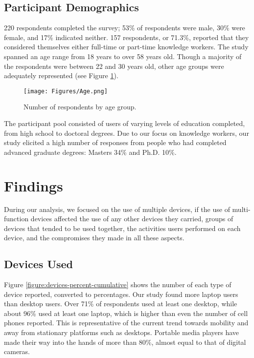 \documentclass[twocolumn,final,10pt]{article}
\begin{document}
\subsection{Participant Demographics}

220 respondents completed the survey; 53\% of respondents were male, 30\% were female, and 17\% indicated neither.
157 respondents, or 71.3\%, reported that they considered themselves either full-time or part-time knowledge workers.
The study spanned an age range from 18 years to over 58 years old. Though a majority of the respondents were between 22 and 30 years old, other age groups were adequately represented (see Figure \ref{figure:age}). 

\begin{figure}[htb] 
   \centering
   \texttt{[image: Figures/Age.png]} 
   \caption{Number of respondents by age group.}
   \label{figure:age}
\end{figure}

The participant pool consisted of users of varying levels of education completed, from high school to doctoral degrees. Due to our focus on knowledge workers, our study elicited a high number of responses from people who had completed advanced graduate degrees: Masters 34\% and Ph.D. 10\%.

\vspace{0.125in}

\section{Findings}

During our analysis, we focused on the use of multiple devices, if the use of multi-function devices affected the use of any other devices they carried, groups of devices that tended to be used together, the activities users performed on each device, and the compromises they made in all these aspects.

\subsection{Devices Used}

Figure \ref{figure:devices-percent-cumulative} shows the number of each type of device reported, converted to percentages. Our study found more laptop users than desktop users. Over 71\% of respondents used at least one desktop, while about 96\% used at least one laptop, which is higher than even the number of cell phones reported. This is representative of the current trend towards mobility and away from stationary platforms such as desktops. Portable media players have made their way into the hands of more than 80\%, almost equal to that of digital cameras.
\end{document}
